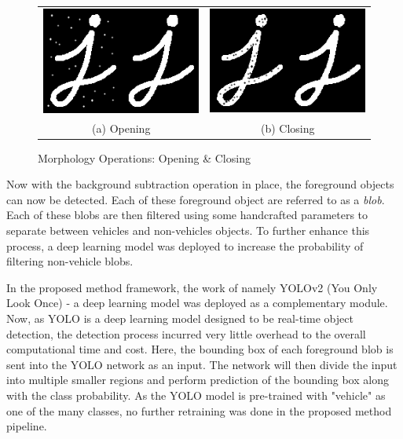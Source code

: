 \begin{figure}[htb!]
  \centering
\begin{tabular}{cc}
 \includegraphics[width=0.4\linewidth]{image/general/opening.png} &  \includegraphics[width=0.4\linewidth]{image/general/closing.png}  \\ 
(a) Opening & (b) Closing \\
\end{tabular}
\caption{Morphology Operations: Opening \& Closing} 
\label{fig:morph2}
\end{figure}




Now with the background subtraction operation in place, the foreground objects can now be detected. Each of these foreground object are referred to as a \textit{blob}. Each of these blobs are then filtered using some handcrafted parameters to separate between vehicles and non-vehicles objects. To further enhance this process, a deep learning model was deployed to increase the probability of filtering non-vehicle blobs. 

In the proposed method framework, the work of \cite{redmon2016you} namely YOLOv2 (You Only Look Once) - a deep learning model was deployed as a complementary module. Now, as YOLO is a deep learning model designed to be real-time object detection, the detection process incurred very little overhead to the overall computational time and cost. Here, the bounding box of each foreground blob is sent into the YOLO network as an input. The network will then divide the input into multiple smaller regions and perform prediction of the bounding box along with the class probability. As the YOLO model is pre-trained with "vehicle" as one of the many classes, no further retraining was done in the proposed method pipeline.

